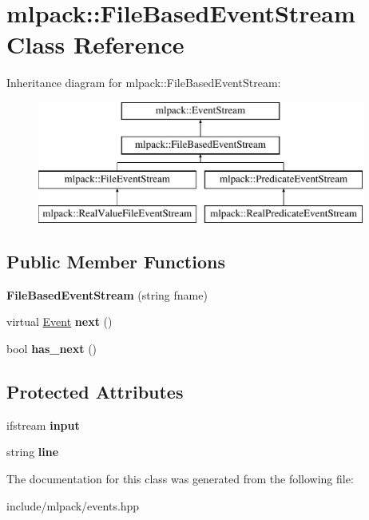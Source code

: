 \hypertarget{classmlpack_1_1_file_based_event_stream}{
\section{mlpack::FileBasedEventStream Class Reference}
\label{classmlpack_1_1_file_based_event_stream}
}
Inheritance diagram for mlpack::FileBasedEventStream:\begin{figure}[H]
\begin{center}
\leavevmode
\includegraphics[height=4.000000cm]{classmlpack_1_1_file_based_event_stream}
\end{center}
\end{figure}
\subsection*{Public Member Functions}
\begin{DoxyCompactItemize}
\item 
\hypertarget{classmlpack_1_1_file_based_event_stream_ae3c00550fbb7b7cd18e62d9ba2863714}{
{\bfseries FileBasedEventStream} (string fname)}
\label{classmlpack_1_1_file_based_event_stream_ae3c00550fbb7b7cd18e62d9ba2863714}

\item 
\hypertarget{classmlpack_1_1_file_based_event_stream_a5f791d0f78009b477d219928a6cb19d7}{
virtual \hyperlink{structmlpack_1_1_event}{Event} {\bfseries next} ()}
\label{classmlpack_1_1_file_based_event_stream_a5f791d0f78009b477d219928a6cb19d7}

\item 
\hypertarget{classmlpack_1_1_file_based_event_stream_a826d8e9828bfe2d67e698e7782f8044c}{
bool {\bfseries has\_\-next} ()}
\label{classmlpack_1_1_file_based_event_stream_a826d8e9828bfe2d67e698e7782f8044c}

\end{DoxyCompactItemize}
\subsection*{Protected Attributes}
\begin{DoxyCompactItemize}
\item 
\hypertarget{classmlpack_1_1_file_based_event_stream_ad5b84711ba9ad5c66db5b454452b9ed7}{
ifstream {\bfseries input}}
\label{classmlpack_1_1_file_based_event_stream_ad5b84711ba9ad5c66db5b454452b9ed7}

\item 
\hypertarget{classmlpack_1_1_file_based_event_stream_a1b6d8662fa3aab1e5647d14b59186127}{
string {\bfseries line}}
\label{classmlpack_1_1_file_based_event_stream_a1b6d8662fa3aab1e5647d14b59186127}

\end{DoxyCompactItemize}


The documentation for this class was generated from the following file:\begin{DoxyCompactItemize}
\item 
include/mlpack/events.hpp\end{DoxyCompactItemize}
